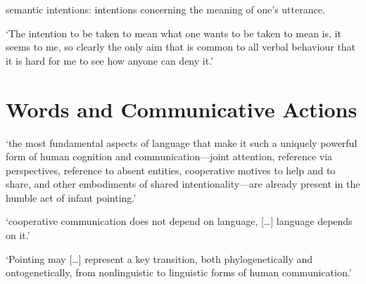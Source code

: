 \documentclass[12pt]{extarticle}
\begin{document}
\begin{multicols}{3}
semantic intentions: intentions concerning the meaning of one’s utterance.
 
‘The intention to be taken to mean what one wants to be taken to mean is, it seems to me, so clearly the only aim that is common to all verbal behaviour that it is hard for me to see how anyone can deny it.’
\citep[p.\ 11]{Davidson:1994ol}
 
 
 
 \section{Words and Communicative Actions}
 
‘the most fundamental aspects of language that make it such a uniquely powerful form of human cognition and communication---joint attention, reference via perspectives, reference to absent entities, cooperative motives to help and to share, and other embodiments of shared intentionality---are already present in the humble act of infant pointing.’ \citep[p.\ 719]{Tomasello:2007fi}
 
‘cooperative communication does not depend on language, […] language depends on it.’ \citep[p.\ 720]{Tomasello:2007fi}
 
‘Pointing may […] represent a key transition, both phylogenetically and ontogenetically, from nonlinguistic to linguistic forms of human communication.’ \citep[p.\ 720]{Tomasello:2007fi}
 

 
 
\footnotesize 


\end{multicols}
\end{document}
